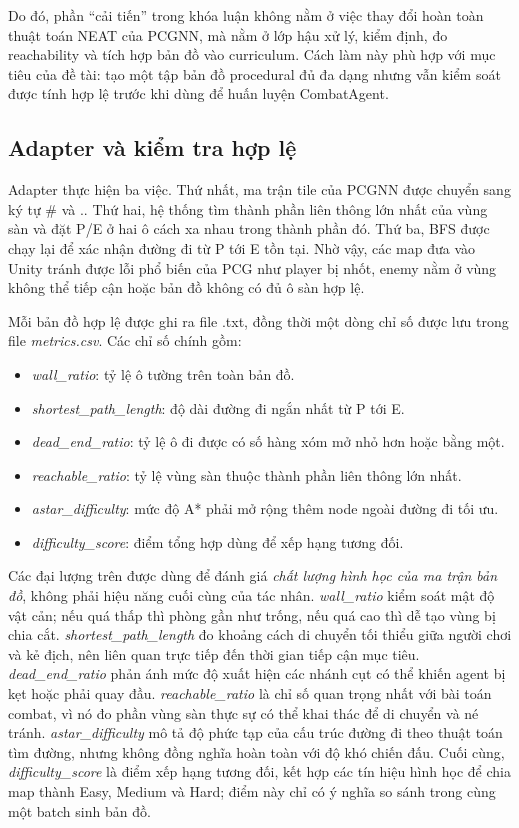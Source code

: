 Do đó, phần ``cải tiến'' trong khóa luận không nằm ở việc thay đổi hoàn toàn thuật toán NEAT của PCGNN, mà nằm ở lớp hậu xử lý, kiểm định, đo reachability và tích hợp bản đồ vào curriculum. Cách làm này phù hợp với mục tiêu của đề tài: tạo một tập bản đồ procedural đủ đa dạng nhưng vẫn kiểm soát được tính hợp lệ trước khi dùng để huấn luyện CombatAgent.

\subsection{Adapter và kiểm tra hợp lệ}

Adapter thực hiện ba việc. Thứ nhất, ma trận tile của PCGNN được chuyển sang ký tự \# và .. Thứ hai, hệ thống tìm thành phần liên thông lớn nhất của vùng sàn và đặt P/E ở hai ô cách xa nhau trong thành phần đó. Thứ ba, BFS được chạy lại để xác nhận đường đi từ P tới E tồn tại. Nhờ vậy, các map đưa vào Unity tránh được lỗi phổ biến của PCG như player bị nhốt, enemy nằm ở vùng không thể tiếp cận hoặc bản đồ không có đủ ô sàn hợp lệ.

Mỗi bản đồ hợp lệ được ghi ra file .txt, đồng thời một dòng chỉ số được lưu trong file \emph{metrics.csv}. Các chỉ số chính gồm:

\begin{itemize}
    \item \emph{wall\_ratio}: tỷ lệ ô tường trên toàn bản đồ.
    \item \emph{shortest\_path\_length}: độ dài đường đi ngắn nhất từ P tới E.
    \item \emph{dead\_end\_ratio}: tỷ lệ ô đi được có số hàng xóm mở nhỏ hơn hoặc bằng một.
    \item \emph{reachable\_ratio}: tỷ lệ vùng sàn thuộc thành phần liên thông lớn nhất.
    \item \emph{astar\_difficulty}: mức độ A* phải mở rộng thêm node ngoài đường đi tối ưu.
    \item \emph{difficulty\_score}: điểm tổng hợp dùng để xếp hạng tương đối.
\end{itemize}

Các đại lượng trên được dùng để đánh giá \emph{chất lượng hình học của ma trận bản đồ}, không phải hiệu năng cuối cùng của tác nhân. \emph{wall\_ratio} kiểm soát mật độ vật cản; nếu quá thấp thì phòng gần như trống, nếu quá cao thì dễ tạo vùng bị chia cắt. \emph{shortest\_path\_length} đo khoảng cách di chuyển tối thiểu giữa người chơi và kẻ địch, nên liên quan trực tiếp đến thời gian tiếp cận mục tiêu. \emph{dead\_end\_ratio} phản ánh mức độ xuất hiện các nhánh cụt có thể khiến agent bị kẹt hoặc phải quay đầu. \emph{reachable\_ratio} là chỉ số quan trọng nhất với bài toán combat, vì nó đo phần vùng sàn thực sự có thể khai thác để di chuyển và né tránh. \emph{astar\_difficulty} mô tả độ phức tạp của cấu trúc đường đi theo thuật toán tìm đường, nhưng không đồng nghĩa hoàn toàn với độ khó chiến đấu. Cuối cùng, \emph{difficulty\_score} là điểm xếp hạng tương đối, kết hợp các tín hiệu hình học để chia map thành Easy, Medium và Hard; điểm này chỉ có ý nghĩa so sánh trong cùng một batch sinh bản đồ.

